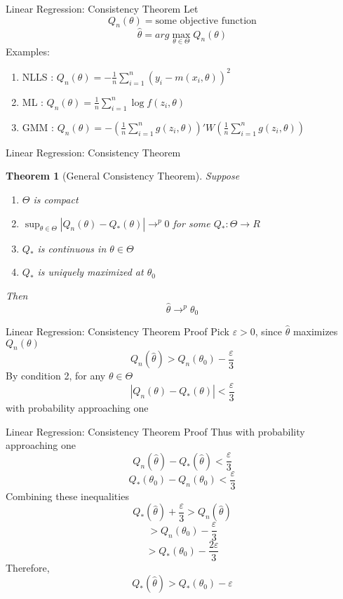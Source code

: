 \documentclass{beamer}
\newtheorem{thm}{Theorem}[subsection]
\begin{document}
\begin{frame}{Linear Regression: Consistency Theorem}
	Let 
	\[Q_n(\theta) = \text{some objective function}\]
	\[\hat{\theta} = arg\max_{\theta \in \Theta} Q_n(\theta)\]
	Examples:
	\begin{enumerate}
		\item NLLS : $Q_n(\theta) = - \frac{1}{n} \sum^n_{i=1} (y_i - m(x_i,\theta))^2$
		\item ML : $Q_n(\theta) = \frac{1}{n} \sum^n_{i=1} \log f(z_i,\theta)$
		\item GMM : $Q_n(\theta) = - (\frac{1}{n} \sum^n_{i=1} g(z_i,\theta))' W (\frac{1}{n} \sum^n_{i=1}g(z_i,\theta))$
	\end{enumerate}
\end{frame}
\begin{frame}{Linear Regression: Consistency Theorem}
	\begin{thm}[General Consistency Theorem]
		Suppose
		\begin{enumerate}
				\item $\Theta$ is compact
				\item $\sup_{\theta \in \Theta} |Q_n(\theta) - Q_{*} (\theta)| \rightarrow^p 0$ for some $Q_*:\Theta \rightarrow R$
				\item $Q_*$ is continuous in $\theta \in \Theta$
				\item $Q_*$ is uniquely maximized at $\theta_0$
		\end{enumerate}
		Then 
		\[\hat{\theta} \rightarrow^p \theta_0\]
	\end{thm}
\end{frame}
\begin{frame}{Linear Regression: Consistency Theorem Proof}
	Pick $\varepsilon>0$, since $\hat{\theta} $ maximizes $Q_n(\theta)$
 \[Q_n(\hat{\theta}) > Q_n(\theta_0) - \frac{\varepsilon}{3}\]
 By condition 2, for any $\theta \in \Theta$
 \[|Q_n(\theta) - Q_*(\theta)| < \frac{\varepsilon}{3}\]
 with probability approaching one
\end{frame}
\begin{frame}{Linear Regression: Consistency Theorem Proof}
	Thus with  probability approaching one
	\[Q_n(\hat{\theta}) - Q_*(\hat{\theta}) < \frac{\varepsilon}{3}\]
	\[Q_*(\theta_0) - Q_n(\theta_0) < \frac{\varepsilon}{3}\]
	Combining these inequalities
	\[Q_*(\hat{\theta}) + \frac{\varepsilon}{3} > Q_n(\hat{\theta})\]
	\[> Q_n(\theta_0) - \frac{\varepsilon}{3}\]
	\[> Q_*(\theta_0) - \frac{2 \varepsilon}{3}\]
	Therefore,
	\[Q_*(\hat{\theta}) >Q_*(\theta_0) - \varepsilon\]
\end{frame}
\end{document}
